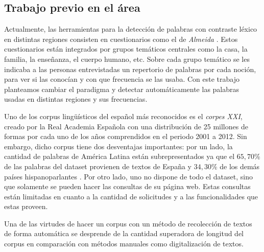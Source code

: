 




\subsection{Trabajo previo en el área}
\par Actualmente, las herramientas para la detección de palabras con contraste léxico en distintas regiones
consisten en cuestionarios como el de \emph{Almeida }\cite{ALMEIDA1995}.  Estos cuestionarios están integrados por grupos temáticos centrales como la casa, la familia, la enseñanza, el cuerpo humano, etc. Sobre cada grupo temático se les indicaba a las personas entrevistadas un repertorio de palabras por cada noción, para ver si las conocían y con que frecuencia se las usaba. 
Con este trabajo planteamos cambiar el paradigma y detectar automáticamente las palabras usadas en distintas regiones y sus frecuencias.

Uno de los corpus lingüísticos del español más reconocidos es el \emph{corpes XXI}\cite{CORPES XXI}, creado por la Real Academia Española con una distribución de 25 millones de formas por cada uno de los años comprendidos en el periodo 2001 a 2012. Sin
embargo, dicho corpus tiene dos desventajas importantes: por un
lado, la cantidad de palabras de América Latina están subrepresentados ya que el $65,70$\% de las palabras del dataset provienen de textos de España y $34,30$\% de los demás países hispanoparlantes . Por otro lado, uno no dispone de todo el dataset, sino que solamente se pueden hacer las consultas de su página web. Estas consultas están limitadas en cuanto a la cantidad de solicitudes y a las funcionalidades que estas proveen.


Una de las virtudes de hacer un corpus con un método de recolección de textos de forma automática se desprende de la cantidad superadora de longitud del corpus en comparación con métodos manuales como digitalización de textos.

